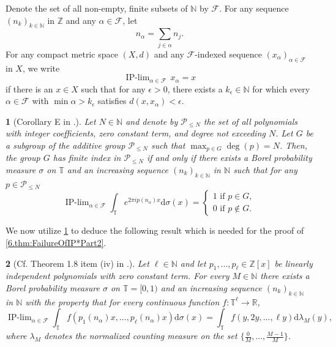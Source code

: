 \documentclass[11pt,american,preprint]{elsarticle}
\numberwithin{equation}{section}
\theoremstyle{plain}
\newtheorem{thm}{\protect\theoremname}[section]
\theoremstyle{plain*}
\theoremstyle{plain}
\theoremstyle{plain*}
\theoremstyle{plain}
\theoremstyle{plain*}
\theoremstyle{remark}
\theoremstyle{remark*}
\theoremstyle{remark}
\theoremstyle{remark*}
\theoremstyle{remark}
\theoremstyle{remark*}
\theoremstyle{plain}
\newtheorem{cor}[thm]{\protect\corollaryname}
\providecommand{\corollaryname}{Corollary}
\theoremstyle{definition}
\theoremstyle{plain}
\theoremstyle{plain} %
\providecommand{\theoremname}{Theorem}
\newcommand{\R}{\mathbb{R}}
\newcommand{\N}{\mathbb{N}}
\newcommand{\Z}{\mathbb{Z}}
\begin{document}
Denote the set of all non-empty, finite subsets of $\N$ by $\mathcal F$. For any sequence $(n_k)_{k\in\N}$ in $\Z$ and any $\alpha\in \mathcal F$, let
$$
n_\alpha=\sum_{j\in\alpha}n_j.
$$
For any compact metric space $(X,d)$ and any $\mathcal F$-indexed  sequence $(x_\alpha)_{\alpha\in\mathcal F}$ in $X$, we
write 
$$
\mathop{\text{IP-lim}}_{\alpha\in\mathcal F}\,x_\alpha=x
$$
if there is an  $x\in X$ such that for any $\epsilon>0$, there exists a $k_\epsilon\in\N$ for which every $\alpha\in\mathcal F$ with $\min \alpha>k_{\epsilon}$ satisfies $d(x,x_\alpha)<\epsilon$.
\begin{cor}[Corollary E in \cite{BKLUltrafilterPoly}.]\label{6.thm:CorollaryE}
    Let $N\in\mathbb N$ and denote by $\mathcal P_{\leq N}$ the set of all polynomials with integer coefficients, zero constant term,  and degree not exceeding  $N$. Let $G$ be a subgroup of the additive group $\mathcal P_{\leq N}$ such that $\max_{p\in G} \deg(p)=N$. Then, the group $G$ has finite index in $\mathcal P_{\leq N}$ if and only if there exists  a Borel probability measure $\sigma$ on $\mathbb T$ and an increasing sequence $(n_k)_{k\in\N}$ in $\N$ such that for any $p\in \mathcal P_{\leq N}$ 
    $$
\mathop{\text{IP-lim}}_{\alpha\in\mathcal F}\int_\mathbb T e^{2\pi i p(n_\alpha)x}\text{d}\sigma(x)=\begin{cases}
1\text{ if }p\in G,\\
0\text{ if }p\not\in G. 
    \end{cases}
    $$
\end{cor}
We now utilize \cref{6.thm:CorollaryE} to deduce the following result which is needed for the proof of \cref{6.thm:FailureOfIP*Part2}.
\begin{thm}[Cf. Theorem 1.8 item (iv) in \cite{zelada2025coexistence}.]\label{6.thm:DistributionResult}
    Let $\ell\in\N$ and let $p_1,...,p_\ell\in\Z[x]$ be linearly independent polynomials with zero constant term. For every $M\in\N$ there exists a Borel probability measure $\sigma$ on $\mathbb T=[0,1)$ and an increasing sequence $(n_k)_{k\in\N}$ in $\N$ with the property that for every continuous function $f:\mathbb T^\ell\rightarrow \R$,
\begin{equation}\label{6.eq:IPDistribution}
\mathop{\text{IP-lim}}_{\alpha\in\mathcal F}\int_\mathbb T f(p_1(n_\alpha)x,...,p_\ell(n_\alpha)x)\text{d}\sigma(x)=\int_{\mathbb T} f(y,2y,...,\ell y)\text{d}\lambda_{M}(y),
\end{equation}
where $\lambda_{M}$ denotes the normalized counting measure on the set $\{\frac{0}{M},...,\frac{M-1}{M}\}$.
\end{thm}
\end{document}
